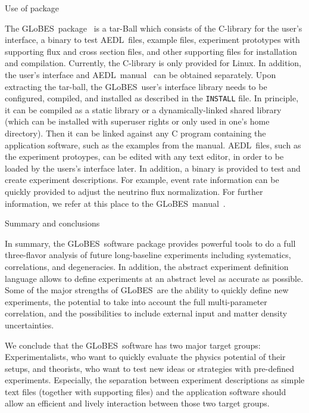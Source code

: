 \documentclass[12pt,a4paper]{article}
\makeatletter
\renewcommand{\section}{\@startsection{section}{1}{0em}{-\baselineskip}%
{\baselineskip}{\normalfont\large\bfseries}}
\newcommand{\GLOBES}{{\sf GLoBES}}
\newcommand{\AEDL}{{\sf AEDL}}
\makeatother
\begin{document}
\section{Use of package}

The \GLOBES\ package~\cite{Globes} is a tar-Ball which consists of the
C-library for the user's interface, a binary to test
\AEDL\ files, example files, 
experiment prototypes with supporting flux and cross 
section files, and other 
supporting files for installation and compilation.
Currently, the C-library is only provided for Linux.
In addition, the user's interface and \AEDL\ manual~\cite{Manual} 
can be obtained separately. Upon extracting the tar-ball,
the \GLOBES\ user's interface library needs to be configured, 
compiled, and installed as 
described in the {\tt INSTALL} file. In principle, it can be
compiled as a static library or a dynamically-linked shared library
(which can be installed with superuser rights or only used in one's
home directory). Then it can be linked against any C program
containing the application software, such as the examples
from the manual. \AEDL\ files, such as the experiment protoypes,
can be edited with any text editor, in order to be loaded by the
users's interface later. In addition, a binary is provided to
test and create experiment descriptions. For example, event rate
information can be quickly provided to adjust the neutrino flux
normalization. For further information, we refer
at this place to the \GLOBES\ manual~\cite{Manual}.

\section{Summary and conclusions}

In summary, the \GLOBES\ software package provides powerful tools
to do a full three-flavor analysis of future long-baseline experiments
including systematics, correlations, and degeneracies. In addition,
the abstract experiment definition language allows to define
experiments at an abstract level as accurate as possible. 
Some of the major strengths of \GLOBES\ are the ability to quickly
define new experiments, the potential to take into account the
full multi-parameter correlation, and the possibilities to include
external input and matter density uncertainties.

We conclude that the \GLOBES\ software has two major target groups:
Experimentalists, who want to quickly evaluate the physics potential
of their setups, and theorists, who want to test new ideas or
strategies with pre-defined experiments. Especially, the separation
between experiment descriptions as simple text files (together
with supporting files) and the application software should allow an
efficient and lively interaction between those two target groups.
\end{document}
